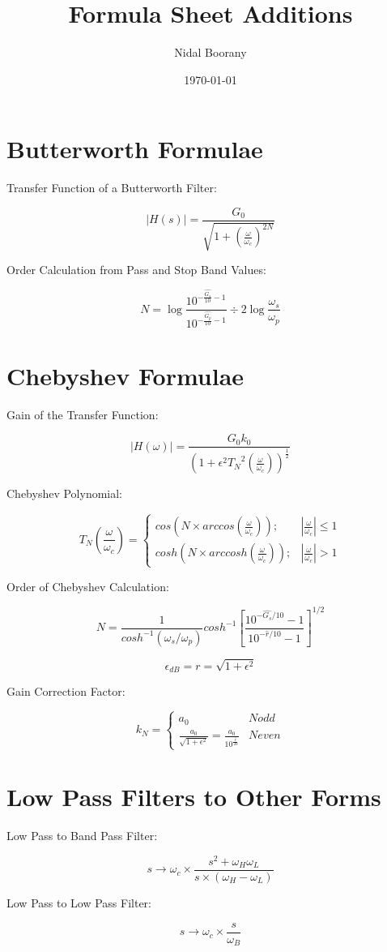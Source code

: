 \documentclass{article}
\begin{document}
\title{Formula Sheet Additions}
\author{Nidal Boorany}
\date{\today}
\maketitle

\section{Butterworth Formulae}
Transfer Function of a Butterworth Filter:

$$|H(s)| = \frac{G_0}{\sqrt{1 + (\frac{\omega}{\omega_c})^{2N}}}$$

Order Calculation from Pass and Stop Band Values:

$$N = \log{\frac{10^{- \frac{\hat{G_s}}{10} - 1}}{10^{- \frac{\hat{G_p}}{ 10} - 1}}} \div {2 \log{\frac{\omega_s}{\omega_p}}}$$

\section{Chebyshev Formulae}

Gain of the Transfer Function:

$$|H(\omega)| = \frac{{G_0} {k_0}}{(1 + {\epsilon}^2 {T_N}^2(\frac{\omega}{\omega_c}))^{\frac{1}{2}}}$$

Chebyshev Polynomial:

$$T_N (\frac{\omega}{\omega_c}) = 
\begin{cases} 
cos(N \times arccos(\frac{\omega}{\omega_c})); & |\frac{\omega}{\omega_c}| \leqslant 1 \\
cosh(N \times arccosh(\frac{\omega}{\omega_c})); & |\frac{\omega}{\omega_c}| > 1
\end{cases}$$

Order of Chebyshev Calculation:

$$N = \frac{1}{cosh^{-1}(\omega_{s}/\omega_{p})}cosh^{-1}\left[\frac{10^{-\hat{G_{s}}/10}-1}{10^{-\hat{r}/10}-1}\right]^{1/2}$$

$$\epsilon_{dB} = r = \sqrt{1 + \epsilon^{2}}$$

Gain Correction Factor:

$$k_N = \begin{cases} 
    a_0 & N odd\\ 
    \frac{a_0}{\sqrt{1+ \epsilon^2}} = \frac{a_0}{10^{\frac{\hat{r}}{20}}} & N even
\end{cases}
$$

\section{Low Pass Filters to Other Forms}

Low Pass to Band Pass Filter:

$$s \rightarrow \omega_c \times \frac{s^2 + \omega_H \omega_L}{s\times (\omega_H - \omega_L)}$$

Low Pass to Low Pass Filter:

$$s \rightarrow \omega_c \times \frac{s}{\omega_B}$$
\end{document}
